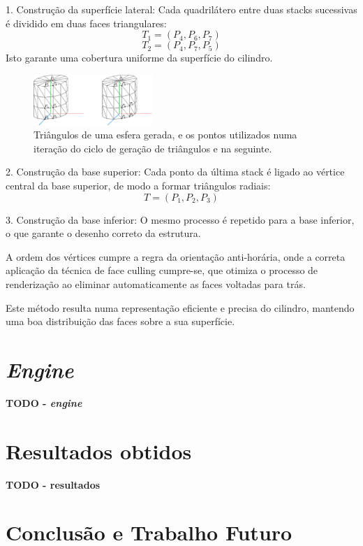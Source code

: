 \documentclass[12pt, a4paper]{article}
\begin{document}
1. Construção da superfície lateral:
Cada quadrilátero entre duas stacks sucessivas é dividido em duas faces triangulares:
\[
T_1 = (P_4, P_6, P_7)
\]
\[
T_2 = (P_4, P_7, P_5)
\]
Isto garante uma cobertura uniforme da superfície do cilindro.

\begin{figure}[H]
    \centering
    \includegraphics[width=0.4\textwidth]{res/figures/cylinder.pdf}
    \caption{
        Triângulos de uma esfera gerada, e os pontos utilizados numa iteração do ciclo de geração
        de triângulos e na seguinte.
    }
\end{figure}

2. Construção da base superior:
Cada ponto da última stack é ligado ao vértice central da base superior, de modo a formar
triângulos radiais:
\[
T = (P_1, P_2, P_3)
\]

3. Construção da base inferior:
O mesmo processo é repetido para a base inferior, o que garante o desenho correto da estrutura.

A ordem dos vértices cumpre a regra da orientação anti-horária, onde a correta
aplicação da técnica de face culling cumpre-se, que otimiza o processo de renderização
ao eliminar automaticamente as faces voltadas para trás.

Este método resulta numa representação eficiente e precisa do cilindro, mantendo uma boa
distribuição das faces sobre a sua superfície.

\section{\emph{Engine}}

\textbf{\color{red} TODO - \emph{engine}}

\section{Resultados obtidos}

\textbf{\color{red} TODO - resultados}

\section{Conclusão e Trabalho Futuro}
\end{document}
